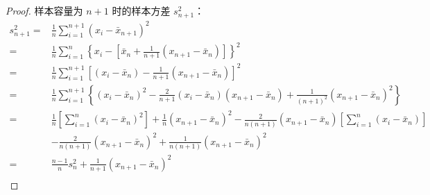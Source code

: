 \documentclass[normal,cn]{elegantnote}
\begin{document}
\begin{enumerate}
\begin{proof}
            样本容量为 $n+1$ 时的样本方差 $s^2_{n+1}$：
            \begin{equation*}
                \begin{aligned}
                    s^2_{n+1}= & \frac{1}{n}\sum_{i=1}^{n+1}\left(x_i-\bar{x}_{n+1}\right)^2                                                                                                                                                                 \\
                    =          & \frac{1}{n}\sum_{i=1}^{n}\left\{x_i-\left[\bar{x}_n+\frac{1}{n+1}\left(x_{n+1}-\bar{x}_n\right)\right]\right\}^2                                                                                                            \\
                    =          & \frac{1}{n}\sum_{i=1}^{n+1}\left[\left(x_i-\bar{x}_n\right)-\frac{1}{n+1}\left(x_{n+1}-\bar{x}_n\right)\right]^2                                                                                                            \\
                    =          & \frac{1}{n}\sum_{i=1}^{n+1}\left\{\left(x_i-\bar{x}_n\right)^2-\frac{2}{n+1}\left(x_i-\bar{x}_n\right)\left(x_{n+1}-\bar{x}_n\right)+\frac{1}{\left(n+1\right)^2}\left(x_{n+1}-\bar{x}_n\right)^2\right\}                   \\
                    =          & \frac{1}{n}\left[\sum_{i=1}^{n}\left(x_i-\bar{x}_n\right)^2\right]+\frac{1}{n}\left(x_{n+1}-\bar{x}_n\right)^2-\frac{2}{n\left(n+1\right)}\left(x_{n+1}-\bar{x}_n\right)\left[\sum_{i=1}^n\left(x_i-\bar{x}_n\right)\right] \\
                               & -\frac{2}{n\left(n+1\right)}\left(x_{n+1}-\bar{x}_n\right)^2+\frac{1}{n\left(n+1\right)}\left(x_{n+1}-\bar{x}_n\right)^2                                                                                                    \\
                    =          & \frac{n-1}{n}s_{n}^{2}+\frac{1}{n+1}\left(x_{n+1}-\bar{x}_{n}\right)^{2}                                                                                                                                                    \\
                \end{aligned}
            \end{equation*}


\end{proof}
\end{enumerate}
\end{document}
